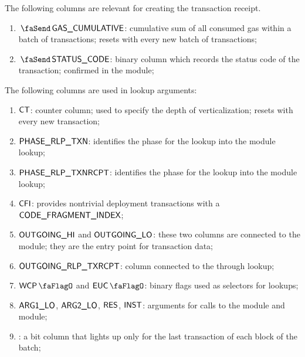 The following columns are relevant for creating the transaction receipt.
\begin{enumerate}[resume]
	\item $\txCumulativeConsumedGas$:
		\markAsComputedHere{}
		cumulative sum of all consumed gas within a batch of transactions; resets with every new batch of transactions; 
	\item $\txStatusCode$:
		\markAsExtractedFromHub{}
		\godGiven{}
		binary column which records the status code of the transaction; confirmed in the \hubMod{} module;
\end{enumerate}
The following columns are used in lookup arguments: 
\begin{enumerate}[resume]
	\item $\textsf{CT}$:
		counter column; used to specify the depth of verticalization; resets with every new transaction; 
	\item $\textsf{PHASE\_RLP\_TXN}$:
		identifies the phase for the lookup into the \rlpTxnMod{} module lookup;
	\item $\textsf{PHASE\_RLP\_TXNRCPT}$:
		identifies the phase for the lookup into the \rlpTxnRcptMod{} module lookup;
	\item $\textsf{CFI}$:
		provides nontrivial deployment transactions with a $\textsf{CODE\_FRAGMENT\_INDEX}$; 
	\item $\textsf{OUTGOING}\textsf{\_HI}$ and $\textsf{OUTGOING}\textsf{\_LO}$:
		these two columns are connected to the \rlpTxnMod{} module; they are the entry point for transaction data;
	\item $\textsf{OUTGOING\_RLP\_TXRCPT}$:
		column connected to the \rlpTxnRcptMod{} through lookup;
	\item $\wcpFlag$ and $\eucFlag$:
		binary flags used as selectors for lookups;
	\item $\textsf{ARG}\textsf{1}\textsf{\_LO}$, $\textsf{ARG}\textsf{2}\textsf{\_LO}$, $\textsf{RES}$, $\textsf{INST}$:
		arguments for calls to the \wcpMod{} module and \eucMod{} module;
	\item \isLastTxOfBlock{}:
		a bit column that lights up only for the last transaction of each block of the batch;
\end{enumerate}

